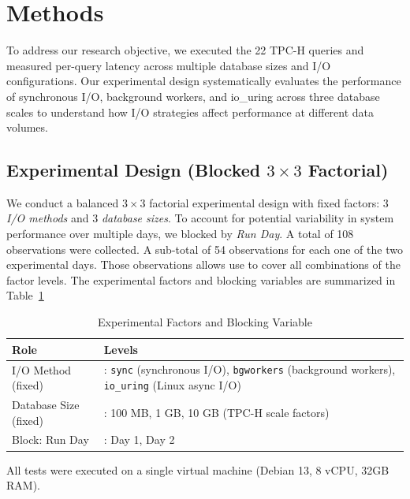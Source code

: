 \documentclass[conference]{IEEEtran}
\begin{document}
\section{Methods}
\label{sec:Methodology}

To address our research objective, we executed the 22 TPC-H queries and measured per-query latency across multiple database sizes and I/O configurations. Our experimental design systematically evaluates the performance of synchronous I/O, background workers, and io\_uring across three database scales to understand how I/O strategies affect performance at different data volumes.


\subsection{Experimental Design (Blocked $3\times3$ Factorial)}

We conduct a balanced $3\times3$ factorial experimental design with fixed factors: 3 \emph{I/O methods} and 3 \emph{database sizes}. To account for potential variability in system performance over multiple days, we blocked by \emph{Run Day}. A total of 108 observations were collected. A sub-total of 54 observations for each one of the two experimental days. Those observations allows use to cover all combinations of the factor levels. The experimental factors and blocking variables are summarized in Table~\ref{tab:factors}

\begin{table}[b]
    \centering
    \caption{Experimental Factors and Blocking Variable}
    \label{tab:factors}
    \renewcommand{\arraystretch}{1.1}
    \begin{tabularx}{\columnwidth}{@{} l >{\raggedright\arraybackslash}X @{}}
        \toprule
        \textbf{Role} & \textbf{Levels} \\
        \midrule
        I/O Method (fixed) &
        3: \texttt{sync} (synchronous I/O), \texttt{bgworkers} (background workers), \texttt{io\_uring} (Linux async I/O) \\
        Database Size (fixed) &
        3: 100 MB, 1 GB, 10 GB (TPC-H scale factors) \\
        Block: Run Day &
        2: Day 1, Day 2 \\
        \bottomrule
    \end{tabularx}
\end{table}

All tests were executed on a single virtual machine (Debian 13, 8 vCPU, 32GB RAM).
\end{document}
